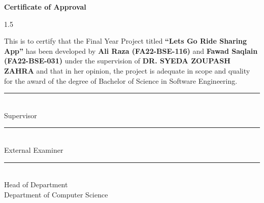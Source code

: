 

\newpage
\thispagestyle{empty}

\begin{center}
\textbf{\LARGE Certificate of Approval}
\end{center}

\vspace{1.5cm}

\begin{spacing}{1.5}

This is to certify that the Final Year Project titled 
\textbf{``Lets Go Ride Sharing App''} 
has been developed by \textbf{Ali Raza (FA22-BSE-116)} and \textbf{Fawad Saqlain (FA22-BSE-031)} under the supervision of \textbf{DR. SYEDA ZOUPASH ZAHRA} and that in her opinion, the project is adequate in scope and quality for the award of the degree of  Bachelor of Science in Software Engineering.

\end{spacing}

\vspace{2.5cm}
\noindent\rule{6cm}{0.4pt}  
\\ 
Supervisor

\vspace{2.5cm}
\noindent\rule{6cm}{0.4pt}  
\\ 
External Examiner

\vspace{2.5cm}

\noindent\rule{6cm}{0.4pt}  
\\ 
Head of Department  
\\ 
Department of Computer Science

\newpage
